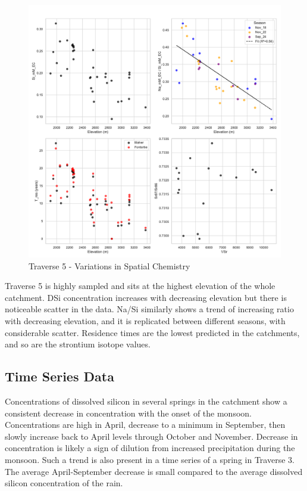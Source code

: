 \begin{figure}[h]
    \centering
        \includegraphics[width=\textwidth]{Traverse_5_summary.pdf}
    \caption{Traverse 5 - Variations in Spatial Chemistry}
    \label{fig:spatial_changes_spring5}
\end{figure}

\FloatBarrier

Traverse 5 is highly sampled and sits at the highest elevation of the whole catchment. DSi concentration increases with decreasing elevation but there is noticeable scatter in the data. Na/Si similarly shows a trend of increasing ratio with decreasing elevation, and it is replicated between different seasons, with considerable scatter. Residence times are the lowest predicted in the catchments, and so are the strontium isotope values.


\subsection{Time Series Data}

Concentrations of dissolved silicon in several springs in the catchment show a consistent decrease in concentration with the onset of the monsoon. Concentrations are high in April, decrease to a minimum in September, then slowly increase back to April levels through October and November. Decrease in concentration is likely a sign of dilution from increased precipitation during the monsoon. Such a trend is also present in a time series of a spring in Traverse 3. The average April-September decrease is small compared to the average dissolved silicon concentration of the rain.


